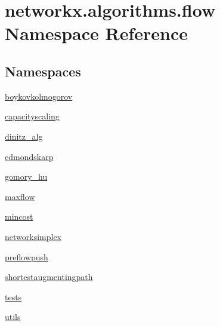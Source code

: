 \hypertarget{namespacenetworkx_1_1algorithms_1_1flow}{}\section{networkx.\+algorithms.\+flow Namespace Reference}
\label{namespacenetworkx_1_1algorithms_1_1flow}
\subsection*{Namespaces}
\begin{DoxyCompactItemize}
\item 
 \hyperlink{namespacenetworkx_1_1algorithms_1_1flow_1_1boykovkolmogorov}{boykovkolmogorov}
\item 
 \hyperlink{namespacenetworkx_1_1algorithms_1_1flow_1_1capacityscaling}{capacityscaling}
\item 
 \hyperlink{namespacenetworkx_1_1algorithms_1_1flow_1_1dinitz__alg}{dinitz\+\_\+alg}
\item 
 \hyperlink{namespacenetworkx_1_1algorithms_1_1flow_1_1edmondskarp}{edmondskarp}
\item 
 \hyperlink{namespacenetworkx_1_1algorithms_1_1flow_1_1gomory__hu}{gomory\+\_\+hu}
\item 
 \hyperlink{namespacenetworkx_1_1algorithms_1_1flow_1_1maxflow}{maxflow}
\item 
 \hyperlink{namespacenetworkx_1_1algorithms_1_1flow_1_1mincost}{mincost}
\item 
 \hyperlink{namespacenetworkx_1_1algorithms_1_1flow_1_1networksimplex}{networksimplex}
\item 
 \hyperlink{namespacenetworkx_1_1algorithms_1_1flow_1_1preflowpush}{preflowpush}
\item 
 \hyperlink{namespacenetworkx_1_1algorithms_1_1flow_1_1shortestaugmentingpath}{shortestaugmentingpath}
\item 
 \hyperlink{namespacenetworkx_1_1algorithms_1_1flow_1_1tests}{tests}
\item 
 \hyperlink{namespacenetworkx_1_1algorithms_1_1flow_1_1utils}{utils}
\end{DoxyCompactItemize}
